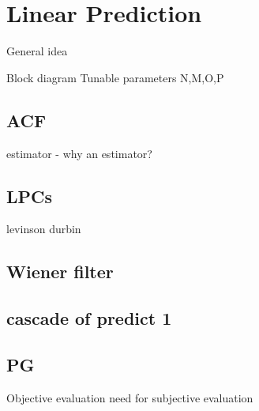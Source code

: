 \section{Linear Prediction}
General idea

Block diagram
Tunable parameters N,M,O,P


\subsection{ACF}
estimator - why an estimator?

\subsection{LPCs}
levinson durbin

\subsection{Wiener filter}

\subsection{cascade of predict 1}

\subsection{PG}
Objective evaluation
need for subjective evaluation